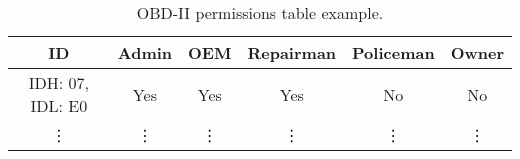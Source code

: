 \begin{table}[]
	\begin{tabular}{|c|c|c|c|c|c|}
		\hline
		\rowcolor[HTML]{9B9B9B} ID & Admin & OEM & Repairman & Policeman & Owner \\ \hline
		\cellcolor[HTML]{9B9B9B} IDH: 07, IDL: E0 & Yes & Yes & Yes & No & No \\ \hline
		\cellcolor[HTML]{9B9B9B} \vdots & \vdots & \vdots & \vdots & \vdots & \vdots
	\end{tabular}
	\caption{OBD-II permissions table example.}
	\label{table:2}
\end{table}

